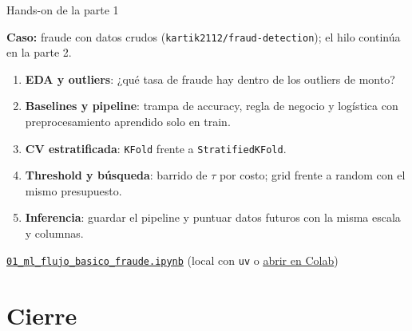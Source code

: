 \documentclass[aspectratio=169,12pt]{beamer}
\begin{document}
\begin{frame}{Hands-on de la parte 1}
  \small
  \textbf{Caso:} fraude con datos crudos (\texttt{kartik2112/fraud-detection}); el hilo continúa en la parte 2.
  \begin{enumerate}
    \item \textbf{EDA y outliers}: ¿qué tasa de fraude hay dentro de los outliers de monto?
    \item \textbf{Baselines y pipeline}: trampa de accuracy, regla de negocio y logística con preprocesamiento aprendido solo en train.
    \item \textbf{CV estratificada}: \texttt{KFold} frente a \texttt{StratifiedKFold}.
    \item \textbf{Threshold y búsqueda}: barrido de $\tau$ por costo; grid frente a random con el mismo presupuesto.
    \item \textbf{Inferencia}: guardar el pipeline y puntuar datos futuros con la misma escala y columnas.
  \end{enumerate}
  \vspace{2pt}
  \begin{toolbox}[Notebook]
    \href{https://github.com/anvasquezre/EAFIT_AA_2026-02/blob/main/notebooks/01_ml_flujo_basico_fraude.ipynb}{\textcolor{eafitneon}{\underline{\texttt{01\_ml\_flujo\_basico\_fraude.ipynb}}}} (local con \texttt{uv} o \href{https://colab.research.google.com/github/anvasquezre/EAFIT_AA_2026-02/blob/main/notebooks/01_ml_flujo_basico_fraude.ipynb}{\textcolor{eafitneon}{\underline{abrir en Colab}}})
  \end{toolbox}
\end{frame}

\section{Cierre}
\end{document}
